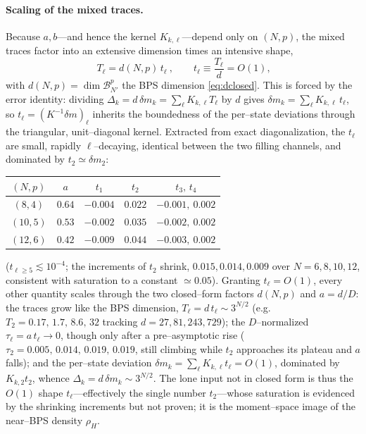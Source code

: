 \documentclass[11pt]{article}
\begin{document}
\paragraph{Scaling of the mixed traces.} Because $a,b$---and hence the kernel $K_{k,\ell}$---depend only
on $(N,p)$, the mixed traces factor into an extensive dimension times an intensive shape,
\begin{equation}
  \boxed{\ T_\ell=d(N,p)\,t_\ell\ },\qquad t_\ell\equiv\frac{T_\ell}{d}=O(1),
  \label{eq:Tscale}
\end{equation}
with $d(N,p)=\dim\mathcal B_{N'}^p$ the BPS dimension \eqref{eq:dclosed}. This is forced by the error
identity: dividing $\Delta_k=d\,\delta m_k=\sum_\ell K_{k,\ell}T_\ell$ by $d$ gives
$\delta m_k=\sum_\ell K_{k,\ell}\,t_\ell$, so $t_\ell=(K^{-1}\delta m)_\ell$ inherits the boundedness of
the per--state deviations through the triangular, unit--diagonal kernel. Extracted from exact
diagonalization, the $t_\ell$ are small, rapidly $\ell$--decaying, identical between the two filling
channels, and dominated by $t_2\simeq\delta m_2$:
\begin{center}
\begin{tabular}{ccccc}
\hline
$(N,p)$ & $a$ & $t_1$ & $t_2$ & $t_3,\,t_4$\\
\hline
$(8,4)$  & $0.64$ & $-0.004$ & $0.022$ & $-0.001,\ 0.002$\\
$(10,5)$ & $0.53$ & $-0.002$ & $0.035$ & $-0.002,\ 0.002$\\
$(12,6)$ & $0.42$ & $-0.009$ & $0.044$ & $-0.003,\ 0.002$\\
\hline
\end{tabular}
\end{center}
($t_{\ell\ge5}\lesssim10^{-4}$; the increments of $t_2$ shrink, $0.015,0.014,0.009$ over
$N=6,8,10,12$, consistent with saturation to a constant $\simeq0.05$). Granting $t_\ell=O(1)$, every
other quantity scales through the two closed--form factors $d(N,p)$ and $a=d/D$: the traces grow like
the BPS dimension, $T_\ell=d\,t_\ell\sim3^{N/2}$ (e.g.\ $T_2=0.17,\,1.7,\,8.6,\,32$ tracking
$d=27,81,243,729$); the $D$--normalized $\tau_\ell=a\,t_\ell\to0$, though only after a pre--asymptotic
rise ($\tau_2=0.005,\,0.014,\,0.019,\,0.019$, still climbing while $t_2$ approaches its plateau and $a$
falls); and the per--state deviation $\delta m_k=\sum_\ell K_{k,\ell}t_\ell=O(1)$, dominated by
$K_{k,2}t_2$, whence $\Delta_k=d\,\delta m_k\sim3^{N/2}$. The lone input not in closed form is thus the
$O(1)$ shape $t_\ell$---effectively the single number $t_2$---whose saturation is evidenced by the
shrinking increments but not proven; it is the moment--space image of the near--BPS density $\rho_H$.
\end{document}
